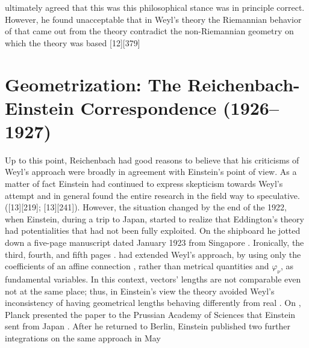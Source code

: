 \documentclass[draft]{article}
\newcommand{\phin}{\ensuremath{\varphi_\nu}\xspace}
\begin{document}
ultimately agreed that this was this philosophical stance was in principle correct. However, he found unacceptable that in Weyl's theory the Riemannian behavior of \rac that came out from the theory contradict the non-Riemannian geometry on which the theory was based [12][379]

\section{Geometrization: The Reichenbach-Einstein Correspondence (1926--1927)}
\label{geometrization}

Up to this point, Reichenbach had good reasons to believe that his criticisms of Weyl's approach were broadly in agreement with Einstein's point of view. As a matter of fact Einstein had continued to express skepticism towards Weyl's attempt  and in general found the entire research in the field way to speculative. ([13][219]; [13][241]). However, the situation changed by the end of the 1922, when Einstein, during a trip to Japan, started to realize that Eddington's theory had potentialities that had not been fully exploited. On the shipboard he jotted down a five-page manuscript dated January 1923 from Singapore . Ironically, the third, fourth, and fifth pages  \citep{Reichenbach1921}. \citet{Eddington1921} had extended Weyl's approach, by using only the coefficients of an affine connection \Gtmn, rather than metrical quantities \gmn and \phin, as fundamental variables. In this context, vectors' lengths are not comparable even not at the same place; thus, in Einstein's view the theory avoided Weyl's inconsistency of having geometrical lengths behaving differently from real \rac.  On , Planck presented the paper  to the Prussian Academy of Sciences that Einstein sent from Japan \citep{Einstein1923c}. After he returned to Berlin, Einstein published two further integrations on the same approach in May \cite{Einstein1923c,Einstein1923e}
\end{document}
